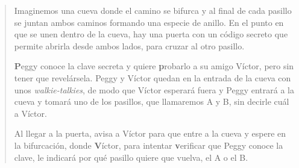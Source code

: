 \begin{quote}
Imaginemos una cueva donde el camino se bifurca y al final de cada pasillo se juntan ambos caminos formando una especie de anillo. En el punto en que se unen dentro de la cueva, hay una puerta con un código secreto que permite abrirla desde ambos lados, para cruzar al otro pasillo.

\textbf{P}eggy conoce la clave secreta y quiere \textbf{p}robarlo a su amigo Víctor, pero sin tener que revelársela.
Peggy y Víctor quedan en la entrada de la cueva con unos \textit{walkie-talkies}, de modo que Víctor esperará fuera y Peggy entrará a la cueva y tomará uno de los pasillos, que llamaremos A y B, sin decirle cuál a Víctor.


Al llegar a la puerta, avisa a Víctor para que entre a la cueva y espere en la bifurcación, donde \textbf{V}íctor, para intentar \textbf{v}erificar que Peggy conoce la clave, le indicará por qué pasillo quiere que vuelva, el A o el B.




\end{quote}
